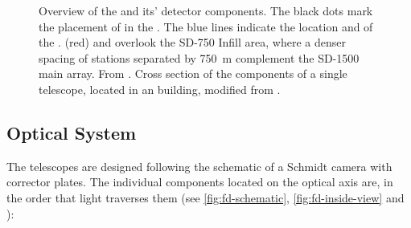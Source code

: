 \begin{figure}[t]
  \centering
  \hspace{0.2cm}
  \caption[]{ Overview of the \PAO and its' detector 
  components. The black dots mark the placement of \WCDs in the \SD. The blue 
  lines indicate the location and \FOV of the \FDs. \HEAT (red) and \CO 
  overlook the SD-750 Infill area, where a denser spacing of stations separated
  by \SI{750}{\meter} complement the SD-1500 main array. From 
  \cite{vebericIndexHttpWebiapkitedu}.  Cross section 
  of the components of a single telescope, located in an \FD building, modified 
  from \cite{abrahamFluorescenceDetectorPierre2010}.}
  \label{fig:pao-images}
\end{figure}


\subsection{Optical System}
\label{ssec:fd-design}

The \FD telescopes are designed following the schematic of a Schmidt camera 
with corrector plates. The individual components located on the optical axis 
are, in the order that light traverses them (see \cref{fig:fd-schematic}, 
\cref{fig:fd-inside-view} and \cite{abrahamFluorescenceDetectorPierre2010}):

